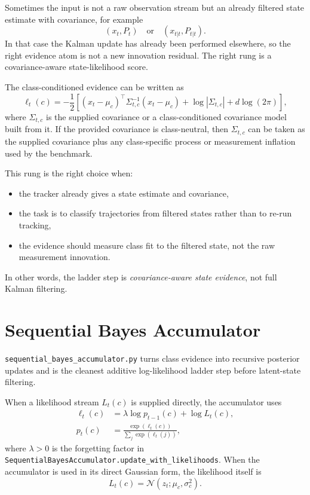 \documentclass[11pt]{article}
\begin{document}
Sometimes the input is not a raw observation stream but an already filtered
state estimate with covariance, for example
\begin{equation}
    (x_t, P_t) \quad \text{or} \quad (x_{t|t}, P_{t|t}).
\end{equation}
In that case the Kalman update has already been performed elsewhere, so the
right evidence atom is not a new innovation residual. The right rung is a
covariance-aware state-likelihood score.

The class-conditioned evidence can be written as
\begin{equation}
    \ell_t(c)
    =
    -\frac{1}{2}
    \left[
        (x_t - \mu_c)^\top \Sigma_{t,c}^{-1}(x_t - \mu_c)
        + \log |\Sigma_{t,c}|
        + d \log(2\pi)
    \right],
\end{equation}
where \(\Sigma_{t,c}\) is the supplied covariance or a class-conditioned
covariance model built from it. If the provided covariance is class-neutral,
then \(\Sigma_{t,c}\) can be taken as the supplied covariance plus any
class-specific process or measurement inflation used by the benchmark.

This rung is the right choice when:
\begin{itemize}[leftmargin=1.5em]
    \item the tracker already gives a state estimate and covariance,
    \item the task is to classify trajectories from filtered states rather than
    to re-run tracking,
    \item the evidence should measure class fit to the filtered state, not the
    raw measurement innovation.
\end{itemize}
In other words, the ladder step is \emph{covariance-aware state evidence}, not
full Kalman filtering.

\section{Sequential Bayes Accumulator}

\texttt{sequential\_bayes\_accumulator.py} turns class evidence into recursive
posterior updates and is the cleanest additive log-likelihood ladder step before
latent-state filtering.

When a likelihood stream \(L_t(c)\) is supplied directly, the accumulator uses
\begin{align}
    \ell_t(c)
    &= \lambda \log p_{t-1}(c) + \log L_t(c), \\
    p_t(c)
    &= \frac{\exp(\ell_t(c))}{\sum_j \exp(\ell_t(j))},
\end{align}
where \(\lambda > 0\) is the forgetting factor in
\texttt{SequentialBayesAccumulator.update\_with\_likelihoods}. When the
accumulator is used in its direct Gaussian form, the likelihood itself is
\begin{equation}
    L_t(c) = \mathcal{N}(z_t; \mu_c, \sigma_c^2).
\end{equation}
\end{document}
